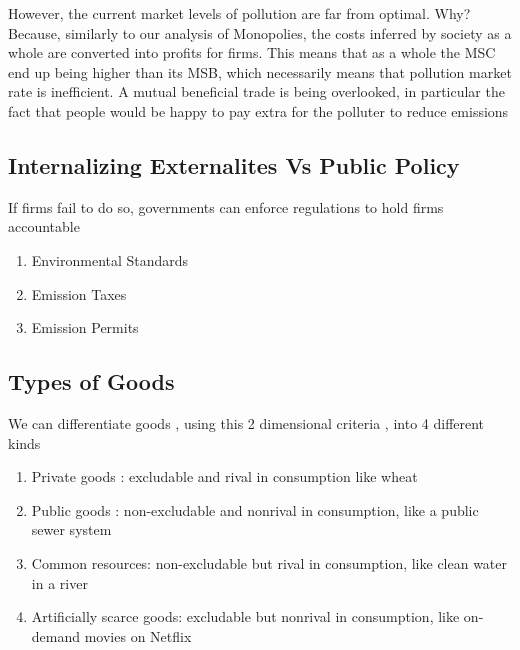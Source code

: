 \documentclass[english,course,draft]{Notes}
\begin{document}
\par{However, the current market levels of pollution are far from optimal. Why? Because, similarly to our analysis of Monopolies, the costs inferred by society as a whole are converted into profits for firms. This means that as a whole the MSC end up being higher than its MSB, which necessarily means that pollution market rate is inefficient. A mutual beneficial trade is being overlooked, in particular the fact that people would be happy to pay extra for the polluter to reduce emissions}

\subsection{Internalizing Externalites Vs Public Policy}


\par{If firms fail to do so, governments can enforce regulations to hold firms accountable}


\begin{enumerate}
	\item Environmental Standards
	\item Emission Taxes
	\item Emission Permits
\end{enumerate}

\subsection{Types of Goods}



\par{We can differentiate goods , using this 2 dimensional criteria , into 4 different kinds}
\begin{enumerate}
	\item Private goods : excludable and rival in consumption like wheat
\item Public goods : non-excludable and nonrival in consumption, like a
public sewer system
\item Common resources: non-excludable but rival in consumption, like
clean water in a river
\item Artificially scarce goods: excludable but nonrival in consumption,
like on-demand movies on Netflix
\end{enumerate}
\end{document}
